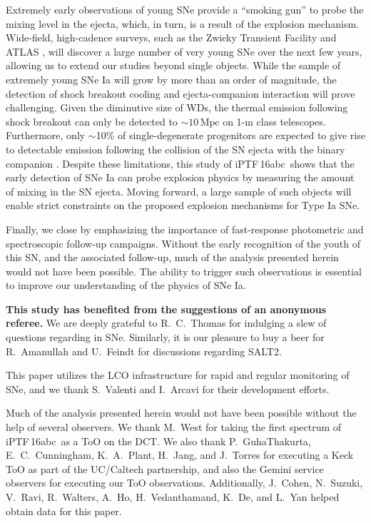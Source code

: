 \documentclass[twocolumn]{aastex61}
\newcommand{\abc}{iPTF\,16abc}
\begin{document}
Extremely early observations of young SNe provide a ``smoking
gun'' to probe the mixing level in the ejecta, which, in turn, is 
a result of the explosion mechanism. Wide-field, high-cadence surveys, such as the Zwicky Transient Facility \citep{2016PASP..128h4501B} and ATLAS \citep{2011PASP..123...58T,2013RSPTA.37120269T}, will discover a large number of very young SNe over the next few years, allowing us to extend our studies beyond single objects. While the sample of extremely young SNe Ia will grow by more than an order of magnitude, the detection of shock breakout cooling and ejecta-companion interaction will prove challenging. Given the diminutive size of WDs, the thermal emission following shock breakout can only be detected to $\sim 10\,\mathrm{Mpc}$ on 1-m class telescopes. Furthermore, only $\sim$10\% of single-degenerate progenitors are expected to give rise to detectable emission following the collision of the SN ejecta with the binary companion \citep{2010ApJ...708.1025K}. Despite these limitations, this study of \abc\ shows that the early detection of SNe Ia can probe explosion physics by measuring the amount of mixing in the SN ejecta. Moving forward, a large sample of such objects will enable strict constraints on the proposed explosion mechanisms for Type Ia SNe.

Finally, we close by emphasizing the importance of fast-response photometric and spectroscopic follow-up campaigns. Without the early recognition of the youth of this SN, and the associated follow-up, much of the analysis presented herein would not have been possible. The ability to trigger such observations is essential to improve our understanding of the physics of SNe Ia.

\acknowledgements

\textbf{This study has benefited from the suggestions of an anonymous
referee.} We are deeply grateful to R.~C.~Thomas for indulging a slew of
questions regarding  in SNe. Similarly, it is our pleasure to buy a
beer for R.~Amanullah and U.~Feindt for discussions regarding SALT2.

This paper utilizes the LCO infrastructure for rapid and regular monitoring of SNe, and we thank S.~Valenti and I.~Arcavi for their development efforts.

Much of the analysis presented herein would not have been possible without the help of several observers. We thank M.~West for taking the first spectrum of \abc\ as a ToO on the DCT. We also thank P.~GuhaThakurta, E.~C.~Cunningham, K.~A.~Plant, H.~Jang, and J.~Torres for executing a Keck ToO as part of the UC/Caltech partnership, and also the Gemini service observers for executing our ToO observations. Additionally, J.~Cohen, N.~Suzuki, V.~Ravi, R.~Walters, A.~Ho, H.~Vedanthamand, K.~De, and L.~Yan helped obtain data for this paper.
\end{document}
